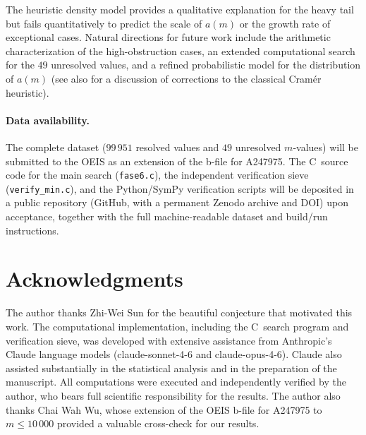 \documentclass[12pt]{article}
\begin{document}
The heuristic density model provides a qualitative explanation for the
heavy tail but fails quantitatively to predict the scale of $a(m)$ or
the growth rate of exceptional cases.
Natural directions for future work include the arithmetic
characterization of the high-obstruction cases, an extended
computational search for the $49$ unresolved values, and a refined
probabilistic model for the distribution of $a(m)$
(see also \cite{Granville1995} for a discussion of corrections to
the classical Cram\'er heuristic).

\paragraph{Data availability.}
The complete dataset ($99\,951$ resolved values and $49$ unresolved
$m$-values) will be submitted to the OEIS as an extension of the
b-file for A247975.
The C~source code for the main search (\texttt{fase6.c}), the
independent verification sieve (\texttt{verify\_min.c}), and the
Python/SymPy verification scripts will be deposited in a public
repository (GitHub, with a permanent Zenodo archive and DOI) upon
acceptance, together with the full machine-readable dataset and
build/run instructions.

\section*{Acknowledgments}

The author thanks Zhi-Wei Sun for the beautiful conjecture that
motivated this work.
The computational implementation, including the C~search program and
verification sieve, was developed with extensive assistance from
Anthropic's Claude language models (claude-sonnet-4-6 and claude-opus-4-6). Claude also assisted substantially in the
statistical analysis and in the preparation of the manuscript.
All computations were executed and independently verified by the author,
who bears full scientific responsibility for the results.
The author also thanks Chai Wah Wu, whose extension of the OEIS b-file
for A247975 to $m \leq 10\,000$ provided a valuable cross-check for
our results.
\end{document}
